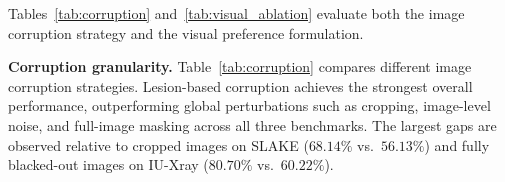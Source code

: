 \begin{table}[ht]
\centering
\small
\begin{minipage}[t]{0.48\textwidth}
    \centering
    \caption{Comparison of image corruption strategies used for visual preference construction.}
    \label{tab:corruption}
\end{minipage}
\hfill
\begin{minipage}[t]{0.48\textwidth}
    \centering
    \caption{Ablation of visual preference formulations.}
    \label{tab:visual_ablation}
\end{minipage}
\end{table}

Tables~\ref{tab:corruption} and~\ref{tab:visual_ablation} evaluate both the image corruption strategy and the visual preference formulation.

\textbf{Corruption granularity.} Table~\ref{tab:corruption} compares different image corruption strategies. Lesion-based corruption achieves the strongest overall performance, outperforming global perturbations such as cropping, image-level noise, and full-image masking across all three benchmarks. The largest gaps are observed relative to cropped images on SLAKE ($68.14\%$ vs.\ $56.13\%$) and fully blacked-out images on IU-Xray ($80.70\%$ vs.\ $60.22\%$).


